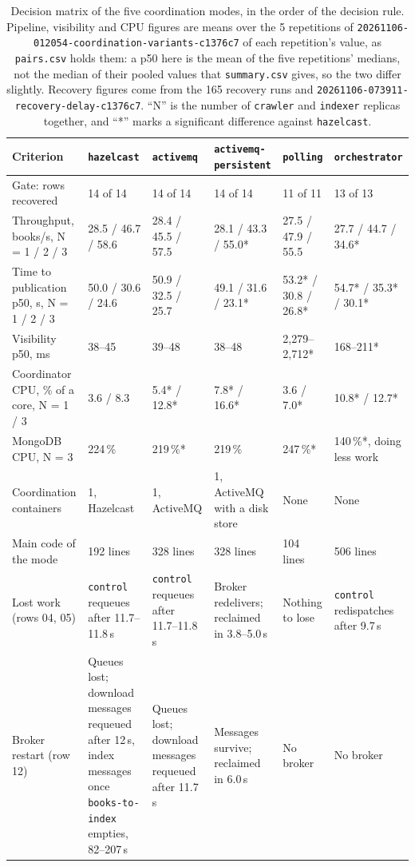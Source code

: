 \documentclass[11pt,a4paper]{article}
\newcommand{\code}[1]{\nolinkurl{#1}}
\newcommand{\mode}[1]{\code{#1}}
\newcommand{\run}[1]{\nolinkurl{#1}}
\begin{document}
\begin{table}[ht]
\centering
\scriptsize
\setlength{\tabcolsep}{3.5pt}
\caption{Decision matrix of the five coordination modes, in the order of the decision rule. Pipeline, visibility and
CPU figures are means over the 5 repetitions of \run{20261106-012054-coordination-variants-c1376c7} of each
repetition's value, as \code{pairs.csv} holds them: a p50 here is the mean of the five repetitions' medians, not the
median of their pooled values that \code{summary.csv} gives, so the two differ slightly. Recovery figures come from
the 165 recovery runs and \run{20261106-073911-recovery-delay-c1376c7}. ``N'' is the number of \code{crawler} and
\code{indexer} replicas together, and ``*'' marks a significant difference against \mode{hazelcast}.}
\label{tab:decision}
\begin{tabularx}{\textwidth}{@{}L{2.45cm}YYYYY@{}}
\toprule
Criterion & \mode{hazelcast} & \mode{activemq} & \mode{activemq-persistent} & \mode{polling} & \mode{orchestrator} \\
\midrule
Gate: rows recovered & 14 of 14 & 14 of 14 & 14 of 14 & 11 of 11 & 13 of 13 \\
\addlinespace
Throughput, books/s, N = 1 / 2 / 3 & 28.5 / 46.7 / 58.6 & 28.4 / 45.5 / 57.5 & 28.1 / 43.3 / 55.0* & 27.5 / 47.9 / 55.5 & 27.7 / 44.7 / 34.6* \\
Time to publication p50, s, N = 1 / 2 / 3 & 50.0 / 30.6 / 24.6 & 50.9 / 32.5 / 25.7 & 49.1 / 31.6 / 23.1* & 53.2* / 30.8 / 26.8* & 54.7* / 35.3* / 30.1* \\
\addlinespace
Visibility p50, ms & 38--45 & 39--48 & 38--48 & 2{,}279--2{,}712* & 168--211* \\
\addlinespace
Coordinator CPU, \% of a core, N = 1 / 3 & 3.6 / 8.3 & 5.4* / 12.8* & 7.8* / 16.6* & 3.6 / 7.0* & 10.8* / 12.7* \\
MongoDB CPU, N = 3 & 224\,\% & 219\,\%* & 219\,\% & 247\,\%* & 140\,\%*, doing less work \\
Coordination containers & 1, Hazelcast & 1, ActiveMQ & 1, ActiveMQ with a disk store & None & None \\
Main code of the mode & 192 lines & 328 lines & 328 lines & 104 lines & 506 lines \\
\addlinespace
Lost work (rows 04, 05) & \code{control} requeues after 11.7--11.8\,s & \code{control} requeues after 11.7--11.8\,s & Broker redelivers; reclaimed in 3.8--5.0\,s & Nothing to lose & \code{control} redispatches after 9.7\,s \\
Broker restart (row 12) & Queues lost; download messages requeued after 12\,s, index messages once \code{books-to-index} empties, 82--207\,s & Queues lost; download messages requeued after 11.7\,s & Messages survive; reclaimed in 6.0\,s & No broker & No broker \\

\end{tabularx}
\end{table}
\end{document}
